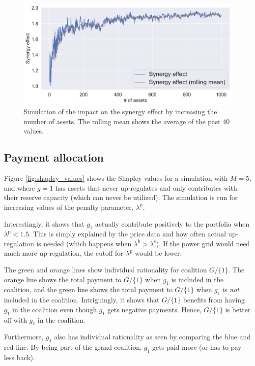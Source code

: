 \documentclass[conference]{IEEEtran}
\begin{document}
\begin{figure}[!t]
    \centering
    \includegraphics[width=\columnwidth]{figures/synergy_effect.png}
    \caption{Simulation of the impact on the synergy effect by increasing the number of assets. The rolling mean shows the average of the past 40 values.}
    \label{fig:synergy_effect}
\end{figure}

\subsection{Payment allocation}

Figure \ref{fig:shapley_values} shows the Shapley values for a simulation with $M = 5$, and where $g = 1$ has assets that never up-regulates and only contributes with their reserve capacity (which can never be utilized). The simulation is run for increasing values of the penalty parameter, $\lambda^{\text{p}}$.

Interestingly, it shows that $g_1$ actually contribute positively to the portfolio when $\lambda^{\text{p}} < 1.5$. This is simply explained by the price data and how often actual up-regulation is needed (which happens when $\lambda^{\text{b}} > \lambda^{\text{s}}$). If the power grid would need much more up-regulation, the cutoff for $\lambda^{\text{p}}$ would be lower.

The green and orange lines show individual rationality for coalition $G / \{1\}$. The orange line shows the total payment to $G / \{1\}$ when $g_1$ is included in the coalition, and the green line shows the total payment to $G / \{1\}$ when $g_1$ is \textit{not} included in the coalition. Intriguingly, it shows that $G / \{1\}$ benefits from having $g_1$ in the coalition even though $g_1$ gets negative payments. Hence, $G / \{1\}$ is better off with $g_1$ in the coalition.

Furthermore, $g_1$ also has individual rationality as seen by comparing the blue and red line. By being part of the grand coalition, $g_1$ gets paid more (or has to pay less back).
\end{document}
